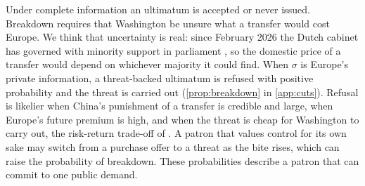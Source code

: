 Under complete information an ultimatum is accepted or never issued. Breakdown requires that Washington be unsure what a transfer would cost Europe. We think that uncertainty is real: since February 2026 the Dutch cabinet has governed with minority support in parliament \citep{nltimes2026coalition, omroepbrabant2026kabinet}, so the domestic price of a transfer would depend on whichever majority it could find. When $\sigma$ is Europe's private information, a threat-backed ultimatum is refused with positive probability and the threat is carried out (\cref{prop:breakdown} in \cref{app:cuts}). Refusal is likelier when China's punishment of a transfer is credible and large, when Europe's future premium is high, and when the threat is cheap for Washington to carry out, the risk-return trade-off of \citet{fearon1995rationalist}. A patron that values control for its own sake may switch from a purchase offer to a threat as the bite rises, which can raise the probability of breakdown. These probabilities describe a patron that can commit to one public demand.
